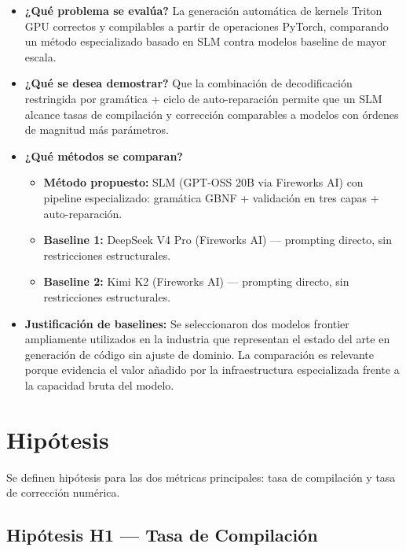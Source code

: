 \documentclass[12pt]{article}
\begin{document}
\begin{itemize}
  \item \textbf{¿Qué problema se evalúa?} La generación automática de kernels Triton GPU
    correctos y compilables a partir de operaciones PyTorch, comparando un método
    especializado basado en SLM contra modelos baseline de mayor escala.

  \item \textbf{¿Qué se desea demostrar?} Que la combinación de decodificación restringida
    por gramática + ciclo de auto-reparación permite que un SLM alcance tasas de
    compilación y corrección comparables a modelos con órdenes de magnitud más parámetros.

  \item \textbf{¿Qué métodos se comparan?}
    \begin{itemize}
      \item \textbf{Método propuesto:} SLM (GPT-OSS 20B via Fireworks AI) con
        pipeline especializado: gramática GBNF + validación en tres capas + auto-reparación.
      \item \textbf{Baseline 1:} DeepSeek V4 Pro (Fireworks AI) — prompting directo, sin
        restricciones estructurales.
      \item \textbf{Baseline 2:} Kimi K2 (Fireworks AI) — prompting directo, sin restricciones
        estructurales.
    \end{itemize}

  \item \textbf{Justificación de baselines:} Se seleccionaron dos modelos frontier
    ampliamente utilizados en la industria que representan el estado del arte en
    generación de código sin ajuste de dominio. La comparación es relevante porque
    evidencia el valor añadido por la infraestructura especializada frente a la capacidad
    bruta del modelo.
\end{itemize}

\section{Hipótesis}

Se definen hipótesis para las dos métricas principales: tasa de compilación y tasa de
corrección numérica.

\subsection{Hipótesis H1 — Tasa de Compilación}
\end{document}
